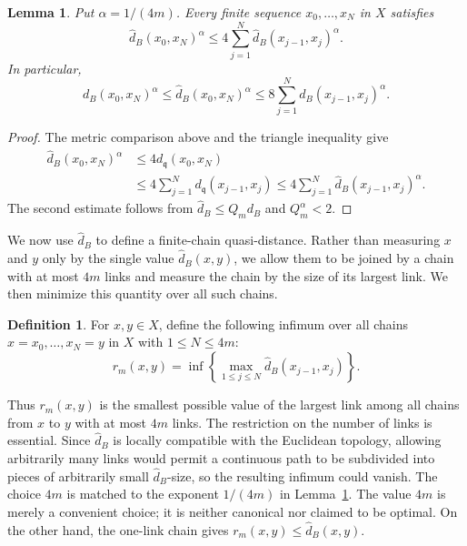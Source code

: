 \documentclass[11pt]{article}
\newtheorem{lemma}[theorem]{Lemma}
\theoremstyle{definition}
\newtheorem{definition}[theorem]{Definition}
\begin{document}
\begin{lemma}\label{lem:power-chain}
Put \(\alpha=1/(4m)\). Every finite sequence \(x_0,\ldots,x_N\) in
\(X\) satisfies
\begin{equation}\label{eq:symmetric-power-chain}
\widehat d_B(x_0,x_N)^\alpha
\le4\sum_{j=1}^N\widehat d_B(x_{j-1},x_j)^\alpha.
\end{equation}
In particular,
\[
d_B(x_0,x_N)^\alpha
\le\widehat d_B(x_0,x_N)^\alpha
\le8\sum_{j=1}^N d_B(x_{j-1},x_j)^\alpha.
\]
\end{lemma}
\begin{proof}
The metric comparison above and the triangle inequality give
\[
\begin{aligned}
\widehat d_B(x_0,x_N)^\alpha
&\le4d_{\mathfrak q}(x_0,x_N)\\
&\le4\sum_{j=1}^N d_{\mathfrak q}(x_{j-1},x_j)
\le4\sum_{j=1}^N\widehat d_B(x_{j-1},x_j)^\alpha.
\end{aligned}
\]
The second estimate follows from
\(\widehat d_B\le Q_m d_B\) and \(Q_m^\alpha<2\).
\end{proof}
We now use \(\widehat d_B\) to define a finite-chain quasi-distance.
Rather than measuring \(x\) and \(y\) only by the single value
\(\widehat d_B(x,y)\), we allow them to be joined by a chain with at most
\(4m\) links and measure the chain by the size of its largest link.
We then minimize this quantity over all such chains.

\begin{definition}\label{def:finite-chain-quasidistance}
	For \(x,y\in X\), define the following infimum over all chains
	\(x=x_0,\ldots,x_N=y\) in \(X\) with \(1\le N\le4m\):
	\begin{equation*}
		r_m(x,y)=\inf\left\{\max_{1\le j\le N}\widehat d_B(x_{j-1},x_j)\right\}.
	\end{equation*}
\end{definition}
Thus \(r_m(x,y)\) is the smallest possible value of the largest link
among all chains from \(x\) to \(y\) with at most \(4m\) links.
The restriction on the number of links is essential.  Since
\(\widehat d_B\) is locally compatible with the Euclidean topology,
allowing arbitrarily many links would permit a continuous path to be
subdivided into pieces of arbitrarily small \(\widehat d_B\)-size, so
the resulting infimum could vanish. 
The choice \(4m\) is matched to the exponent \(1/(4m)\) in
Lemma~\ref{lem:power-chain}.
The value \(4m\) is merely a convenient choice; it is neither
canonical nor claimed to be optimal.
On the other hand, the one-link chain gives
\(r_m(x,y)\le \widehat d_B(x,y)\).
\end{document}
